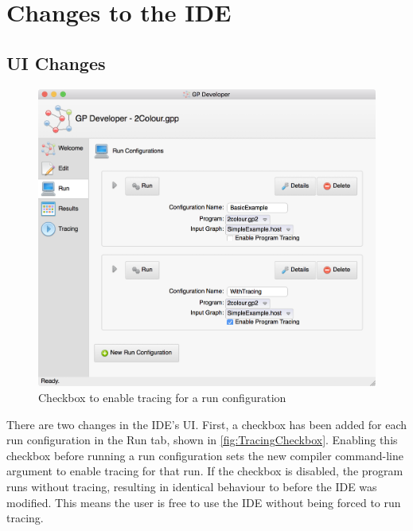 \documentclass[authoryearcitations]{UoYCSproject}
\newenvironment{nscenter}
    {\parskip=0pt\par\nopagebreak\centering}
    {\par\noindent\ignorespacesafterend}
\begin{document}

\section{Changes to the IDE}
\label{sec:ChangesToTheIDE}

\subsection{UI Changes}
\label{sec:UIChanges}

\begin{figure}[!htb]
    \begin{nscenter}
        \includegraphics[width=\textwidth]{TracingCheckbox}
    \end{nscenter}
    \caption{Checkbox to enable tracing for a run configuration}
    \label{fig:TracingCheckbox}
\end{figure}

There are two changes in the IDE's UI. First, a checkbox has been added for each
run configuration in the Run tab, shown in \autoref{fig:TracingCheckbox}. Enabling
this checkbox before running a run configuration sets the new compiler command-line
argument to enable tracing for that run. If the checkbox is disabled, the program
runs without tracing, resulting in identical behaviour to before the IDE was
modified. This means the user is free to use the IDE without being forced to run
tracing.
\end{document}
